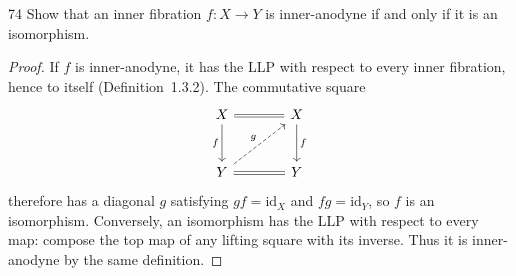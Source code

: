 \begin{exercise}{74}
Show that an inner fibration $f\colon X\to Y$ is inner-anodyne if and only if it is an
isomorphism.

\begin{proof}
If $f$ is inner-anodyne, it has the LLP with respect
to every inner fibration, hence to itself
(Definition~1.3.2).
The commutative square
\[
 \begin{tikzcd}[column sep=large,row sep=large]
  X \arrow[r,equal] \arrow[d,"f"'] & X \arrow[d,"f"] \\
  Y \arrow[r,equal] \arrow[ur,dashed,"g"] & Y
 \end{tikzcd}
\]
therefore has a diagonal $g$ satisfying
$gf=\mathrm{id}_X$ and $fg=\mathrm{id}_Y$, so $f$ is
an isomorphism.
Conversely, an isomorphism has the LLP with respect
to every map: compose the top map of any lifting
square with its inverse.
Thus it is inner-anodyne by the same definition.
\end{proof}
\end{exercise}

